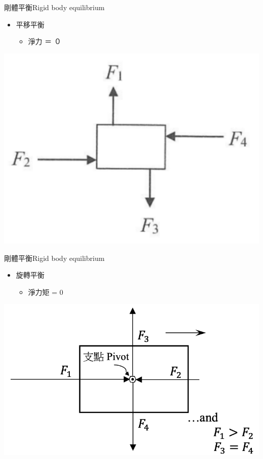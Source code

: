\documentclass[beamer=true]{standalone}
\begin{document}
\begin{frame}{剛體平衡Rigid body equilibrium}
    \begin{itemize}
        \item 平移平衡
              \begin{itemize}
                  \item 淨力  ＝ ０
              \end{itemize}
    \end{itemize}
    {\par\centering
    \includegraphics[width=.45\textwidth]{assets/e0f98693.png}

    \par}

\end{frame}
\begin{frame}{剛體平衡Rigid body equilibrium}
    \begin{itemize}
        \item 旋轉平衡
              \begin{itemize}
                  \item 淨力矩 = 0
              \end{itemize}
    \end{itemize}
    {\par\centering
    \includegraphics[width=.5\textwidth]{assets/4eeeca69.png}
    \par}

\end{frame}
\end{document}
